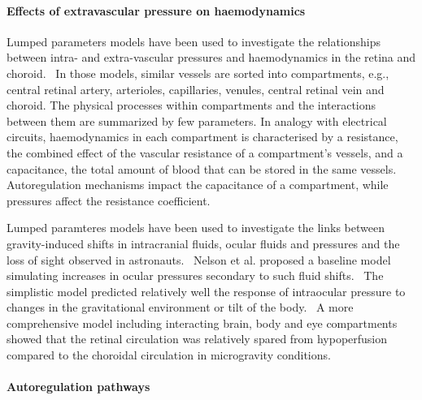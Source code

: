 \documentclass{article}
\begin{document}
\paragraph*{Effects of extravascular pressure on haemodynamics} %

Lumped parameters models have been used to investigate the relationships between intra- and extra-vascular pressures and haemodynamics in the retina and choroid.~\cite{Chiaravalli_2021,Fawzi_2019,Guidoboni_2014a,Nelson_2017,Petersen_2022,Prudhomme_2021,Sala_2020,Salerni_2019}
In those models, similar vessels are sorted into compartments, e.g., central retinal artery, arterioles, capillaries, venules, central retinal vein and choroid.
The physical processes within compartments and the interactions between them are summarized by few parameters.
In analogy with electrical circuits, haemodynamics in each compartment is characterised by a resistance, the combined effect of the vascular resistance of a compartment's vessels, and a capacitance, the total amount of blood that can be stored in the same vessels.
Autoregulation mechanisms impact the capacitance of a compartment, while pressures affect the resistance coefficient.

Lumped paramteres models have been used to investigate the links between gravity-induced shifts in intracranial fluids, ocular fluids and pressures and the loss of sight observed in astronauts.~\cite{Nelson_2017,Petersen_2022,Salerni_2019}
Nelson et al. proposed a baseline model simulating increases in ocular pressures secondary to such fluid shifts.~\cite{Nelson_2017}
The simplistic model predicted relatively well the response of intraocular pressure to changes in the gravitational environment or tilt of the body.~\cite{Nelson_2017,Petersen_2022}
A more comprehensive model including interacting brain, body and eye compartments showed that the retinal circulation was relatively spared from hypoperfusion compared to the choroidal circulation in microgravity conditions.~\cite{Salerni_2019}


\paragraph*{Autoregulation pathways}
\end{document}
